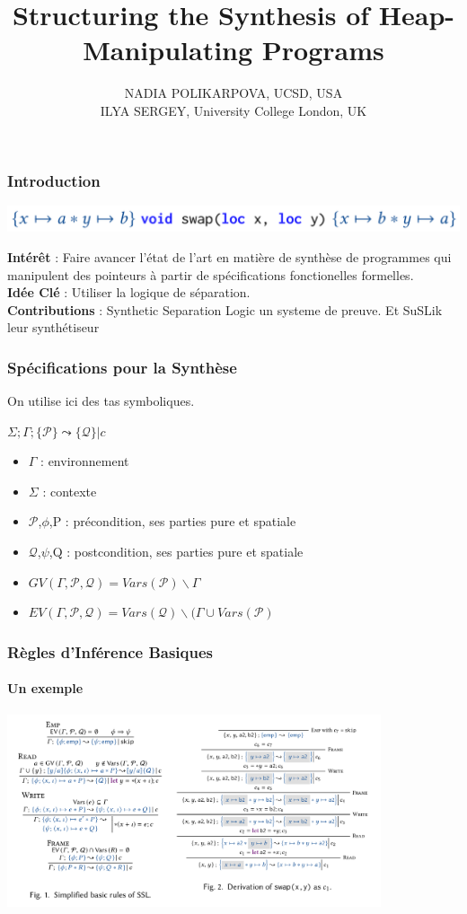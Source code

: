 \documentclass[french]{beamer}
\title{Structuring the Synthesis of Heap-Manipulating Programs}
\author{NADIA POLIKARPOVA, UCSD, USA \\ILYA SERGEY, University College London, UK}
\date{}
\begin{document}
	\maketitle
\begin{frame}[fragile]
	\frametitle{Introduction}
	
	\begin{center}
		\includegraphics[height=\baselineskip]{figures/swap.png}
	\end{center}
	\textbf{Intérêt} : Faire avancer l'état de l'art en matière de synthèse de programmes qui manipulent des pointeurs à partir de spécifications fonctionelles formelles.\\
	\textbf{Idée Clé} : Utiliser la logique de séparation.\\
	\textbf{Contributions} : Synthetic Separation Logic un systeme de preuve. Et SuSLik leur synthétiseur
\end{frame}
\begin{frame}[fragile]
	\frametitle{Spécifications pour la Synthèse}
	On utilise ici des tas symboliques.\\
	\begin{center}
	$\Sigma;\Gamma;\{\mathcal{P}\}\leadsto\{\mathcal{Q}\} | c$
	\end{center}
	\begin{itemize}
		\item $\Gamma$ : environnement
		\item $\Sigma$ : contexte
		\item $\mathcal{P}$,$\phi$,P : précondition, ses parties pure et spatiale
		\item $\mathcal{Q}$,$\psi$,Q : postcondition, ses parties pure et spatiale
		\item $GV(\Gamma,\mathcal{P},\mathcal{Q}) = Vars(\mathcal{P}) \backslash \Gamma$ 
		\item $EV(\Gamma,\mathcal{P},\mathcal{Q}) = Vars(\mathcal{Q}) \backslash (\Gamma \cup Vars(\mathcal{P})$ 
	\end{itemize}
\end{frame}
\begin{frame}[fragile]
	\frametitle{Règles d'Inférence Basiques}
	\framesubtitle{Un exemple}
	\includegraphics[width=11cm]{figures/basic.png}
\end{frame}
\end{document}
